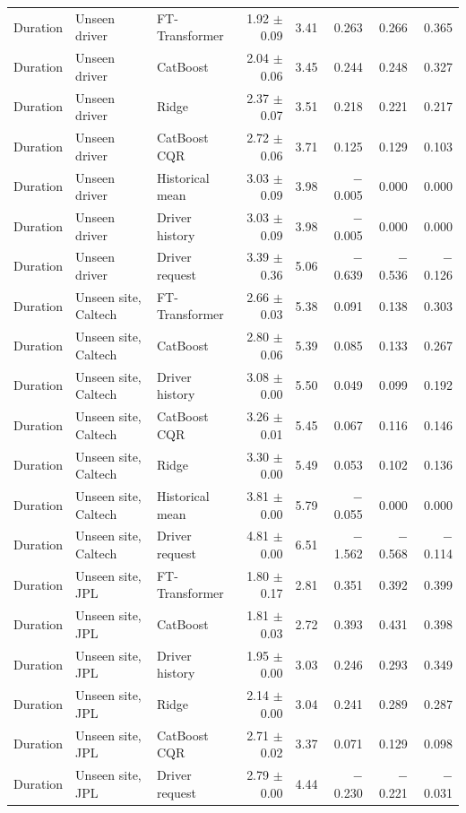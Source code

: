 {\begin{longtable}{lllrrrrr}
Duration & Unseen driver & FT-Transformer & 1.92 $\pm$ 0.09 & 3.41 & 0.263 & 0.266 & 0.365 \\
Duration & Unseen driver & CatBoost & 2.04 $\pm$ 0.06 & 3.45 & 0.244 & 0.248 & 0.327 \\
Duration & Unseen driver & Ridge & 2.37 $\pm$ 0.07 & 3.51 & 0.218 & 0.221 & 0.217 \\
Duration & Unseen driver & CatBoost CQR & 2.72 $\pm$ 0.06 & 3.71 & 0.125 & 0.129 & 0.103 \\
Duration & Unseen driver & Historical mean & 3.03 $\pm$ 0.09 & 3.98 & $-$0.005 & 0.000 & 0.000 \\
Duration & Unseen driver & Driver history & 3.03 $\pm$ 0.09 & 3.98 & $-$0.005 & 0.000 & 0.000 \\
Duration & Unseen driver & Driver request & 3.39 $\pm$ 0.36 & 5.06 & $-$0.639 & $-$0.536 & $-$0.126 \\
Duration & Unseen site, Caltech & FT-Transformer & 2.66 $\pm$ 0.03 & 5.38 & 0.091 & 0.138 & 0.303 \\
Duration & Unseen site, Caltech & CatBoost & 2.80 $\pm$ 0.06 & 5.39 & 0.085 & 0.133 & 0.267 \\
Duration & Unseen site, Caltech & Driver history & 3.08 $\pm$ 0.00 & 5.50 & 0.049 & 0.099 & 0.192 \\
Duration & Unseen site, Caltech & CatBoost CQR & 3.26 $\pm$ 0.01 & 5.45 & 0.067 & 0.116 & 0.146 \\
Duration & Unseen site, Caltech & Ridge & 3.30 $\pm$ 0.00 & 5.49 & 0.053 & 0.102 & 0.136 \\
Duration & Unseen site, Caltech & Historical mean & 3.81 $\pm$ 0.00 & 5.79 & $-$0.055 & 0.000 & 0.000 \\
Duration & Unseen site, Caltech & Driver request & 4.81 $\pm$ 0.00 & 6.51 & $-$1.562 & $-$0.568 & $-$0.114 \\
Duration & Unseen site, JPL & FT-Transformer & 1.80 $\pm$ 0.17 & 2.81 & 0.351 & 0.392 & 0.399 \\
Duration & Unseen site, JPL & CatBoost & 1.81 $\pm$ 0.03 & 2.72 & 0.393 & 0.431 & 0.398 \\
Duration & Unseen site, JPL & Driver history & 1.95 $\pm$ 0.00 & 3.03 & 0.246 & 0.293 & 0.349 \\
Duration & Unseen site, JPL & Ridge & 2.14 $\pm$ 0.00 & 3.04 & 0.241 & 0.289 & 0.287 \\
Duration & Unseen site, JPL & CatBoost CQR & 2.71 $\pm$ 0.02 & 3.37 & 0.071 & 0.129 & 0.098 \\
Duration & Unseen site, JPL & Driver request & 2.79 $\pm$ 0.00 & 4.44 & $-$0.230 & $-$0.221 & $-$0.031 \\

\end{longtable}}
